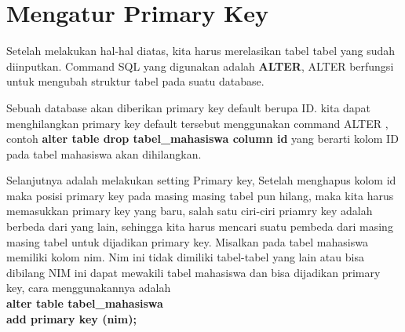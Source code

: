 \section{Mengatur Primary Key}

Setelah melakukan hal-hal diatas, kita harus merelasikan tabel tabel yang sudah diinputkan. Command SQL yang digunakan adalah \textbf{ALTER}, ALTER berfungsi untuk mengubah struktur tabel pada suatu database.
\par 
Sebuah database akan diberikan primary key default berupa ID. kita dapat menghilangkan primary key default tersebut menggunakan command ALTER , contoh \textbf{alter table drop tabel\_mahasiswa column id } yang berarti kolom ID pada tabel mahasiswa akan dihilangkan.
\par
Selanjutnya adalah melakukan setting Primary key, Setelah menghapus kolom id maka posisi primary key pada masing masing tabel pun hilang, maka kita harus memasukkan primary key yang baru, salah satu ciri-ciri priamry key adalah berbeda dari yang lain, sehingga kita harus mencari suatu pembeda dari masing masing tabel untuk dijadikan primary key. Misalkan pada tabel mahasiswa memiliki kolom nim. Nim ini tidak dimiliki tabel-tabel yang lain atau bisa dibilang NIM ini dapat mewakili tabel mahasiswa dan bisa dijadikan primary key, cara menggunakannya adalah\\
\textbf{alter table tabel\_mahasiswa}\\
\textbf{add primary key (nim);}\\

